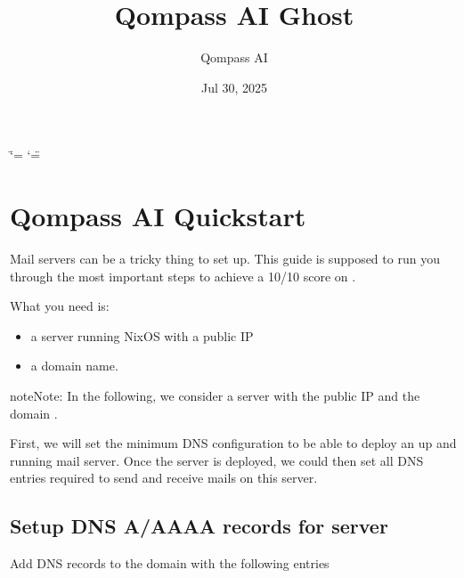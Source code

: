 \documentclass[letterpaper,10pt,english]{sphinxmanual}
\title{Qompass AI Ghost}
\date{Jul 30, 2025}
\author{Qompass AI}
\let\sphinxpxdimen\pdfpxdimen\else\newdimen\sphinxpxdimen
\begin{document}
\ifdefined\shorthandoff
  \ifnum\catcode`\=\string=\active\shorthandoff{=}\fi
  \ifnum\catcode`\"=\active{}\fi
\fi

\pagestyle{empty}
\sphinxmaketitle
\pagestyle{plain}
\sphinxtableofcontents
\pagestyle{normal}
\label{\detokenize{index::doc}}


\noindent\sphinxincludegraphics[width=400\sphinxpxdimen]{{ghost}.svg}

\sphinxstepscope


\chapter{Qompass AI Quickstart}
\label{\detokenize{quickstart:qompass-ai-quickstart}}\label{\detokenize{quickstart::doc}}
\sphinxAtStartPar
Mail servers can be a tricky thing to set up. This guide is supposed to
run you through the most important steps to achieve a 10/10 score on
.

\sphinxAtStartPar
What you need is:
\begin{itemize}
\item {} 
\sphinxAtStartPar
a server running NixOS with a public IP

\item {} 
\sphinxAtStartPar
a domain name.

\end{itemize}

\begin{sphinxadmonition}{note}{Note:}
\sphinxAtStartPar
In the following, we consider a server with the public IP 
and the domain .
\end{sphinxadmonition}

\sphinxAtStartPar
First, we will set the minimum DNS configuration to be able to deploy
an up and running mail server. Once the server is deployed, we could
then set all DNS entries required to send and receive mails on this
server.


\section{Setup DNS A/AAAA records for server}
\label{\detokenize{quickstart:setup-dns-a-aaaa-records-for-server}}
\sphinxAtStartPar
Add DNS records to the domain  with the following
entries
\end{document}
